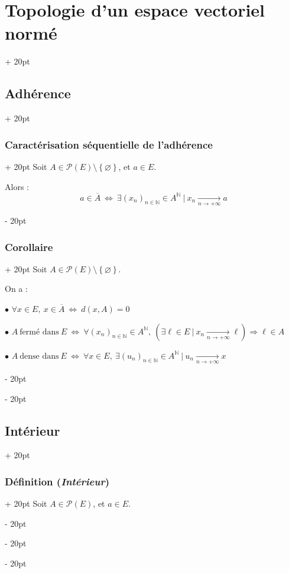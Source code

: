 \documentclass[a4paper, 12pt, twoside]{article}
\newcommand{\N}{\mathbb{N}} %
\newcommand{\cj}[1]{\overline{#1}} %
\newcommand{\tendsto}[1]{\xrightarrow[#1]{}}
\newcommand{\set}[1]{\left\{ #1 \right\}}
\newcommand{\ssi}{\ \Leftrightarrow \ }
\newcommand{\ind}[1][20pt]{\advance\leftskip + #1}
\newcommand{\deind}[1][20pt]{\advance\leftskip - #1}
\newenvironment{indt}[2][20pt]{#2 \par \ind[#1]}{\par \deind} %
\begin{document}
\begin{indt}{\section{Topologie d'un espace vectoriel normé}}
\begin{indt}{\subsection{Adhérence}}
            \vspace{12pt}
            
            \begin{indt}{\subsubsection{Caractérisation séquentielle de l'adhérence}}
                Soit $A \in \mathcal P(E) \setminus \set \varnothing$, et $a \in E$.

                Alors :
                \[
                    a \in \cj A
                    \ssi
                    \exists (x_n)_{n \in \N} \in A^\N\ |\ x_n \tendsto{n \to +\infty} a
                \]
            \end{indt}

            \vspace{12pt}
            
            \begin{indt}{\subsubsection{Corollaire}}
                Soit $A \in \mathcal P(E) \setminus \set \varnothing$.

                On a :

                \vspace{6pt}
                
                $\bullet$ $\forall x \in E,\ x \in \cj A \ssi d(x, A) = 0$

                $\bullet$
                $
                    A\ \text{fermé dans}\ E
                    \ssi
                    \forall (x_n)_{n \in \N} \in A^\N,\
                    (\exists \ell \in E\ |\ x_n \tendsto{n \to +\infty} \ell) \Rightarrow \ell \in A
                $

                $\bullet$
                $
                    A\ \text{dense dans}\ E
                    \ssi
                    \forall x \in E,\
                    \exists (u_n)_{n \in \N} \in A^\N\ |\ u_n \tendsto{n \to +\infty} x
                $
            \end{indt}
        \end{indt}

        \vspace{12pt}
        
        \begin{indt}{\subsection{Intérieur}}
            \begin{indt}{\subsubsection{Définition (\textit{Intérieur})}}
                Soit $A \in \mathcal P(E)$, et $a \in E$.


\end{indt}
\end{indt}
\end{indt}
\end{document}
